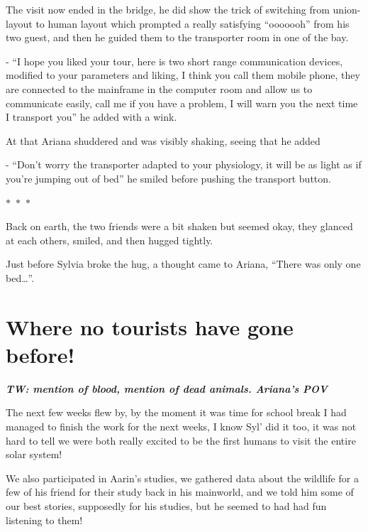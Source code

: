 \documentclass[colorlinks,12pt,a4paper]{book}
\newcommand\sep{\begin{center}
  \boldmath $\ast$~$\ast$~$\ast$
\end{center}}
\begin{document}
The visit now ended in the bridge, he did show the trick of switching from union-layout to human layout which prompted 
a really satisfying “ooooooh” from his two guest, and then he guided them to the transporter room in one of the bay.\par
\bigskip

- “I hope you liked your tour, here is two short range communication devices, modified to your parameters and 
liking, I think you call them mobile phone, they are connected to the mainframe in the computer room and allow us 
to communicate easily, call me if you have a problem, I will warn you the next time I transport you” he added with a wink.\par
\bigskip

At that Ariana shuddered and was visibly shaking, seeing that he added\par
\bigskip

- “Don't worry the transporter adapted to your physiology, it will be as light as if you're jumping out of bed” 
he smiled before pushing the transport button.

\sep

Back on earth, the two friends were a bit shaken but seemed okay, they glanced at each others, smiled, and then 
hugged tightly.\par
\bigskip

Just before Sylvia broke the hug, a thought came to Ariana, “There was only one bed…”.

\chapter{Where no tourists have gone before!}

\textit{\textbf{TW: mention of blood, mention of dead animals. Ariana's POV}}\par
\bigskip

The next few weeks flew by, by the moment it was time for school break I had managed to finish the work for the next weeks, 
I know Syl' did it too, it was not hard to tell we were both really excited to be the first humans to visit the entire 
solar system!\par
\bigskip

We also participated in Aarin's studies, we gathered data about the wildlife for a few of his friend for their study 
back in his mainworld, and we told him some of our best stories, supposedly for his studies, but he seemed to had had 
fun listening to them!\par
\bigskip
\end{document}
